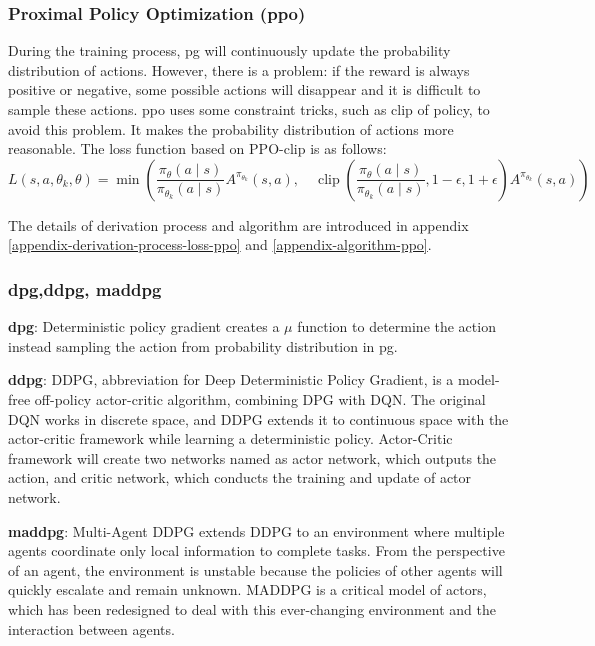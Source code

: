 \subsubsection{Proximal Policy Optimization (\gls{ppo})}
During the training process, \gls{pg} will continuously update the probability distribution of actions. However, there is a problem: if the reward is always positive or negative, some possible actions will disappear and it is difficult to sample these actions. \gls{ppo} uses some constraint tricks, such as clip of policy, to avoid this problem. It makes the probability distribution of actions more reasonable. The loss function based on PPO-clip is as follows:
\begin{equation}
L\left(s, a, \theta_{k}, \theta\right)=\min \left(\frac{\pi_{\theta}(a \mid s)}{\pi_{\theta_{k}}(a \mid s)} A^{\pi_{\theta_{k}}}(s, a), \quad \operatorname{clip}\left(\frac{\pi_{\theta}(a \mid s)}{\pi_{\theta_{k}}(a \mid s)}, 1-\epsilon, 1+\epsilon\right) A^{\pi_{\theta_{k}}}(s, a)\right)
\end{equation} 

The details of derivation process and algorithm are introduced in appendix \ref{appendix-derivation-process-loss-ppo} and \ref{appendix-algorithm-ppo}.

\subsubsection{\gls{dpg},\gls{ddpg}, \gls{maddpg}} \label{background:maddpg}

\textbf{\gls{dpg}}: Deterministic policy gradient creates a $\mu$ function to determine the action instead sampling the action from probability distribution in \gls{pg}.

\textbf{\gls{ddpg}}: DDPG\parencite{Lillicrap2015}, abbreviation for Deep Deterministic Policy Gradient, is a model-free off-policy actor-critic algorithm, combining DPG with DQN. The original DQN works in discrete space, and DDPG extends it to continuous space with the actor-critic framework while learning a deterministic policy. Actor-Critic framework will create two networks named as actor network, which outputs the action, and critic network, which conducts the training and update of actor network.

\textbf{\gls{maddpg}}: Multi-Agent DDPG\parencite{maddpg2017} extends DDPG to an environment where multiple agents coordinate only local information to complete tasks. From the perspective of an agent, the environment is unstable because the policies of other agents will quickly escalate and remain unknown. MADDPG is a critical model of actors, which has been redesigned to deal with this ever-changing environment and the interaction between agents. 

